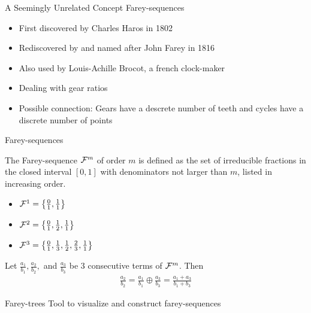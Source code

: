 \begin{frame}{A Seemingly Unrelated Concept}
	Farey-sequences
	\begin{itemize}
		\item First discovered by Charles Haros in 1802
		\item Rediscovered by and named after John Farey in 1816 \pause
		\item Also used by Louis-Achille Brocot, a french clock-maker
		\item Dealing with gear ratios \pause
		\item Possible connection: Gears have a descrete number of teeth and cycles have a discrete number of points
	\end{itemize}
\end{frame}

\begin{frame}{Farey-sequences}
	\vspace{-1em}
	\begin{definition}
		The Farey-sequence $\mathcal{F}^m$ of order $m$ is defined as the set of irreducible fractions in the closed interval $[0, 1]$
		with denominators not larger than $m$, listed in increasing order.
	\end{definition}
	\pause
	\begin{itemize}
		\item $\mathcal{F}^1 = \left\{ \frac{0}{1}, \frac{1}{1} \right\}$ \vspace{.1em}
		\item $\mathcal{F}^2 = \left\{ \frac{0}{1}, \frac{1}{2}, \frac{1}{1} \right\}$ \vspace{.1em}
		\item $\mathcal{F}^3 = \left\{ \frac{0}{1}, \frac{1}{3}, \frac{1}{2}, \frac{2}{3}, \frac{1}{1} \right\}$
	\end{itemize}
	\pause
	\begin{theorem}
		Let $\frac{a_1}{b_1}, \frac{a_2}{b_2},$ and $\frac{a_3}{b_3}$ be 3 consecutive terms of $\mathcal{F}^m$. Then
		\begin{align*}
			\frac{a_2}{b_2} = \frac{a_1}{b_1} \oplus \frac{a_3}{b_3} = \frac{a_1 + a_3}{b_1 + b_3}
		\end{align*}
	\end{theorem}
\end{frame}

\begin{frame}{Farey-trees}
	Tool to visualize and construct farey-sequences
	\begin{figure}
	\end{figure}
\end{frame}

